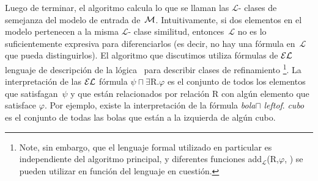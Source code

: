 Luego de terminar, el algoritmo calcula lo que se llaman las $\mathcal {L}$- clases de semejanza del modelo de entrada de~$\mathcal{M} $. Intuitivamente, si dos elementos en el modelo pertenecen a la misma $\mathcal {L}$- clase similitud, entonces~$\mathcal {L}$ no es lo suficientemente expresiva para diferenciarlos (es decir, no hay una f\'ormula en~$\mathcal {L }$ que pueda distinguirlos).
El algoritmo que discutimos utiliza f\'ormulas de $\mathcal{EL}$ lenguaje de descripci\'on de la l\'ogica~\cite{baad:desc03} para describir clases de refinamiento \footnote {Note, sin embargo, que el lenguaje formal utilizado en particular es independiente del algoritmo principal, y diferentes funciones add$_{\mathcal {L}}$(R,$\varphi $, \RE) se pueden utilizar en funci\'on del lenguaje en cuesti\'on.}.
La interpretaci\'on de las $\mathcal{EL}$ f\'ormula $\psi \sqcap \exists $R.$ \varphi$ es el conjunto de todos los elementos que satisfagan~$\psi$ y que est\'an relacionados por relaci\'on R con alg\'un elemento que satisface $\varphi $.
Por ejemplo, existe la interpretaci\'on de la f\'ormula \emph{bola}$\sqcap$ \emph{leftof}. \emph{cubo} es el conjunto de todas las bolas que est\'an a la izquierda de alg\'un cubo.






